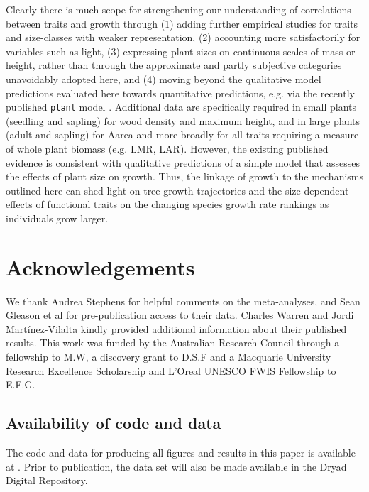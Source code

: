 \documentclass[a4paper,11pt]{article}
\begin{document}
Clearly there is much scope for strengthening our understanding of correlations between traits and growth through (1) adding further empirical studies for traits and size-classes with weaker representation, (2) accounting more satisfactorily for variables such as light, (3) expressing plant sizes on continuous scales of mass or height, rather than through the approximate and partly subjective categories unavoidably adopted here, and (4) moving beyond the qualitative model predictions evaluated here towards quantitative predictions, e.g. via the recently published \texttt{plant} model \citep{Falster-2016}. Additional data are specifically required in small plants (seedling and sapling) for wood density and maximum height, and in large plants (adult and sapling) for Aarea and more broadly for all traits requiring a measure of whole plant biomass (e.g. LMR, LAR). However, the existing published evidence is consistent with qualitative predictions of a simple model that assesses the effects of plant size on growth. Thus, the linkage of growth to the mechanisms outlined here can shed light on tree growth trajectories and the size-dependent effects of functional traits on the changing species growth rate rankings as individuals grow larger.

\section*{Acknowledgements}\label{Acknowledgment}

We thank Andrea Stephens for helpful comments on the meta-analyses, and Sean Gleason et al for pre-publication access to their data. Charles Warren and Jordi Mart{\'{i}}nez-Vilalta kindly provided additional information about their published results. This work was funded by the Australian Research Council through a fellowship to M.W, a discovery grant to D.S.F and a Macquarie University Research Excellence Scholarship and L’Oreal UNESCO FWIS Fellowship to E.F.G.

\subsection*{Availability of code and data}\label{code}

The code and data for producing all figures and results in this paper is available at . Prior to publication, the data set will also be made available in the Dryad Digital Repository.

\linespread{1}
\label{references}
\end{document}
